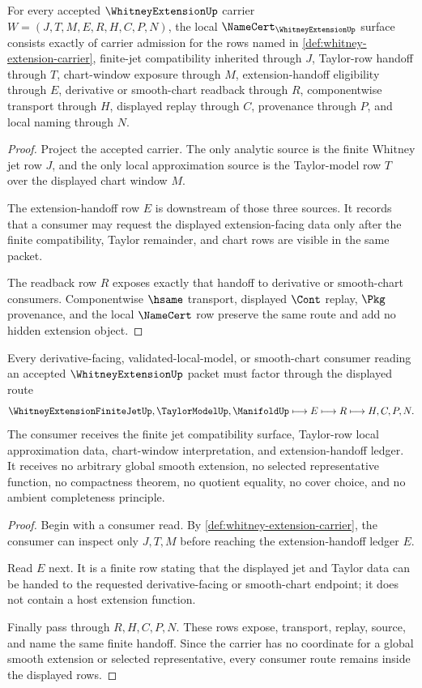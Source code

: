 \begin{theorem}
\label{thm:whitney-extension-namecert-obligations}
For every accepted $\WhitneyExtensionUp$ carrier $W=(J,T,M,E,R,H,C,P,N)$, the local $\NameCert_{\WhitneyExtensionUp}$ surface consists exactly of carrier admission for the rows named in \autoref{def:whitney-extension-carrier}, finite-jet compatibility inherited through $J$, Taylor-row handoff through $T$, chart-window exposure through $M$, extension-handoff eligibility through $E$, derivative or smooth-chart readback through $R$, componentwise transport through $H$, displayed replay through $C$, provenance through $P$, and local naming through $N$.
\end{theorem}
\begin{proof}
Project the accepted carrier. The only analytic source is the finite Whitney jet row $J$, and the only local approximation source is the Taylor-model row $T$ over the displayed chart window $M$.

The extension-handoff row $E$ is downstream of those three sources. It records that a consumer may request the displayed extension-facing data only after the finite compatibility, Taylor remainder, and chart rows are visible in the same packet.

The readback row $R$ exposes exactly that handoff to derivative or smooth-chart consumers. Componentwise $\hsame$ transport, displayed $\Cont$ replay, $\Pkg$ provenance, and the local $\NameCert$ row preserve the same route and add no hidden extension object.
\end{proof}

\begin{theorem}
\label{thm:whitney-extension-jet-handoff}
Every derivative-facing, validated-local-model, or smooth-chart consumer reading an accepted $\WhitneyExtensionUp$ packet must factor through the displayed route
$$
\WhitneyExtensionFiniteJetUp,\TaylorModelUp,\ManifoldUp
\longmapsto E \longmapsto R \longmapsto H,C,P,N .
$$
The consumer receives the finite jet compatibility surface, Taylor-row local approximation data, chart-window interpretation, and extension-handoff ledger. It receives no arbitrary global smooth extension, no selected representative function, no compactness theorem, no quotient equality, no cover choice, and no ambient completeness principle.
\end{theorem}
\begin{proof}
Begin with a consumer read. By \autoref{def:whitney-extension-carrier}, the consumer can inspect only $J,T,M$ before reaching the extension-handoff ledger $E$.

Read $E$ next. It is a finite row stating that the displayed jet and Taylor data can be handed to the requested derivative-facing or smooth-chart endpoint; it does not contain a host extension function.

Finally pass through $R,H,C,P,N$. These rows expose, transport, replay, source, and name the same finite handoff. Since the carrier has no coordinate for a global smooth extension or selected representative, every consumer route remains inside the displayed rows.
\end{proof}

